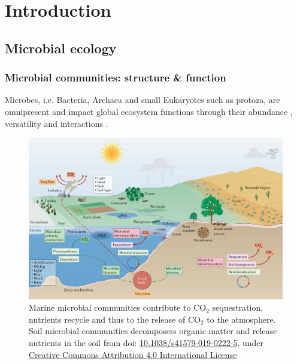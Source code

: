 \chapter{Introduction}
\label{cha:intro}


\section{Microbial ecology}

\subsection{Microbial communities: structure \& function}

   Microbes, i.e. Bacteria, Archaea and small Eukaryotes such as protoza, are omnipresent and impact global ecosystem functions \citep{falkowski2008microbial} through their abundance \citep{bar2018biomass}, versatility \citep{rees2017improving} and interactions \citep{rottjers2018hairballs}. 



   \begin{figure}[h]
      \centering
      \includegraphics[width=135mm]{figures/ecosystem_functioning.png}
      \caption[The cycle of C and the role of microbial communiites]{Marine microbial communities contribute to CO$_2$ sequestration, nutrients recycle and thus to the release of CO$_2$ to the atmosphere. 
      Soil microbial communities decomposers organic matter and release nutrients in the soil 
      from \citep{cavicchioli2019scientists} doi: \href{https://doi.org/10.1038/s41579-019-0222-5}{10.1038/s41579-019-0222-5}, under \href{http://creativecommons.org/licenses/by/4.0 license}{Creative Commons Attribution 4.0 International License}
      }
   \end{figure}




